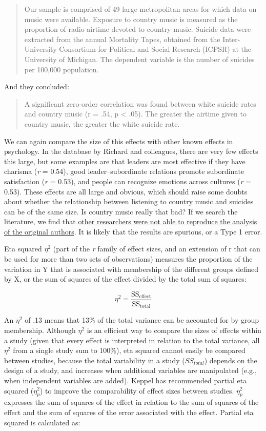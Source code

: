 \documentclass[
  oneside]{book}
\begin{document}
\begin{quote}
Our sample is comprised of 49 large metropolitan areas for which data on music were available. Exposure to country music is measured as the proportion of radio airtime devoted to country music. Suicide data were extracted from the annual Mortality Tapes, obtained from the Inter-University Consortium for Political and Social Research (ICPSR) at the University of Michigan. The dependent variable is the number of suicides per 100,000 population.
\end{quote}

And they concluded:

\begin{quote}
A significant zero-order correlation was found between white suicide rates and country music (r = .54, p \textless{} .05). The greater the airtime given to country music, the greater the white suicide rate.
\end{quote}

We can again compare the size of this effects with other known effects in psychology. In the database by Richard and colleagues, there are very few effects this large, but some examples are that leaders are most effective if they have charisma (\emph{r} = 0.54), good leader--subordinate relations promote subordinate satisfaction (\emph{r} = 0.53), and people can recognize emotions across cultures (\emph{r} = 0.53). These effects are all large and obvious, which should raise some doubts about whether the relationship between listening to country music and suicides can be of the same size. Is country music really that bad? If we search the literature, we find that \href{http://sf.oxfordjournals.org/content/74/1/327.short}{other researchers were not able to reproduce the analysis of the original authors}. It is likely that the results are spurious, or a Type 1 error.

Eta squared \(\eta^2\) (part of the \emph{r} family of effect sizes, and an extension of r that can be used for more than two sets of observations) measures the proportion of the variation in Y that is associated with membership of the different groups defined by X, or the sum of squares of the effect divided by the total sum of squares:

\[\eta^{2} = \frac{\text{SS}_{\text{effect}}}{\text{SS}_{\text{total}}}\]

An \(\eta^2\) of .13 means that 13\% of the total variance can be accounted for by group membership. Although \(\eta^2\) is an efficient way to compare the sizes of effects within a study (given that every effect is interpreted in relation to the total variance, all \(\eta^2\) from a single study sum to 100\%), eta squared cannot easily be compared between studies, because the total variability in a study (\(SS_{total}\)) depends on the design of a study, and increases when additional variables are manipulated (e.g., when independent variables are added). Keppel \citep{keppel_design_1991} has recommended partial eta squared (\(\eta_{p}^{2}\)) to improve the comparability of effect sizes between studies. \(\eta_{p}^{2}\) expresses the sum of squares of the effect in relation to the sum of squares of the effect and the sum of squares of the error associated with the effect. Partial eta squared is calculated as:
\end{document}
